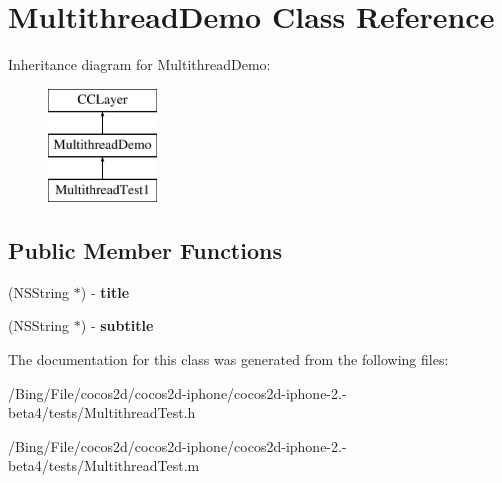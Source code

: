 \hypertarget{interface_multithread_demo}{\section{Multithread\-Demo Class Reference}
\label{interface_multithread_demo}
}
Inheritance diagram for Multithread\-Demo\-:\begin{figure}[H]
\begin{center}
\leavevmode
\includegraphics[height=3.000000cm]{interface_multithread_demo}
\end{center}
\end{figure}
\subsection*{Public Member Functions}
\begin{DoxyCompactItemize}
\item 
\hypertarget{interface_multithread_demo_abef8e0fd72474d8b49e4c754dcdd631b}{(N\-S\-String $\ast$) -\/ {\bfseries title}}\label{interface_multithread_demo_abef8e0fd72474d8b49e4c754dcdd631b}

\item 
\hypertarget{interface_multithread_demo_a5fed387ac8d12d22f70157423495d15a}{(N\-S\-String $\ast$) -\/ {\bfseries subtitle}}\label{interface_multithread_demo_a5fed387ac8d12d22f70157423495d15a}

\end{DoxyCompactItemize}


The documentation for this class was generated from the following files\-:\begin{DoxyCompactItemize}
\item 
/\-Bing/\-File/cocos2d/cocos2d-\/iphone/cocos2d-\/iphone-\/2.-\/beta4/tests/Multithread\-Test.\-h\item 
/\-Bing/\-File/cocos2d/cocos2d-\/iphone/cocos2d-\/iphone-\/2.-\/beta4/tests/Multithread\-Test.\-m\end{DoxyCompactItemize}
